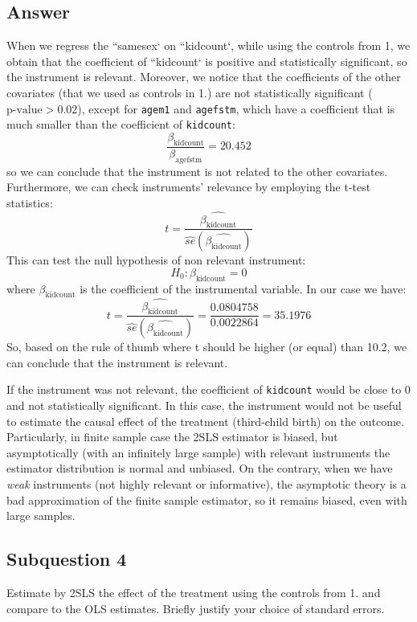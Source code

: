 \documentclass{article}
\begin{document}
	\subsection{Answer}
	When we regress the ``samesex` on ``kidcount`, while using the controls from 1, we obtain that the coefficient of ``kidcount` is positive and statistically significant, so the instrument is relevant.
	Moreover, we notice that the coefficients of the other covariates (that	we used as controls in 1.) are not statistically significant ($\text{p-value}> 0.02$), except for \verb|agem1| and \verb|agefstm|, which have a coefficient that is much smaller than the coefficient of \verb|kidcount|:
	\begin{equation}
		\frac{\beta_{\text{kidcount}}}{\beta_{\text{agefstm}}} = 20.452
	\end{equation}
	so we can conclude that the instrument is not related to the other covariates.
	Furthermore, we can check instruments' relevance by employing the t-test statistics:
	$$t = \frac{\hat{\beta_{\text{kidcount}}}}{\hat{se}(\hat{\beta_{\text{kidcount}}})} $$
	This can test the null hypothesis of non relevant instrument:
	$$H_0 : \beta_{\text{kidcount}} =0$$
	where $\beta_{\text{kidcount}}$ is the coefficient of the instrumental variable.
	In our case we have:
	$$t = \frac{\hat{\beta_{\text{kidcount}}}}{\hat{se}(\hat{\beta_{\text{kidcount}}})} = \frac{0.0804758}{0.0022864} = 35.1976$$
	So, based on the rule of thumb where t should be higher (or equal) than 10.2, we can conclude that the instrument is relevant.
	
	If the instrument was not relevant, the coefficient of \verb|kidcount| would be close to 0 and not statistically significant. In this case, the instrument would not be useful to estimate the causal effect of the treatment (third-child birth) on the outcome.
	Particularly, in finite sample case the 2SLS estimator is biased, but asymptotically (with an infinitely large sample) with relevant instruments the estimator distribution is normal and unbiased. On the contrary, when we have \textit{weak} instruments (not highly relevant or informative), the asymptotic theory is a bad approximation of the finite sample	estimator, so it remains biased, even with large samples.
	
	\subsection{Subquestion 4}
	Estimate by 2SLS the effect of the treatment using the controls from 1. and compare to the OLS estimates. Briefly justify your choice of standard errors.
\end{document}
